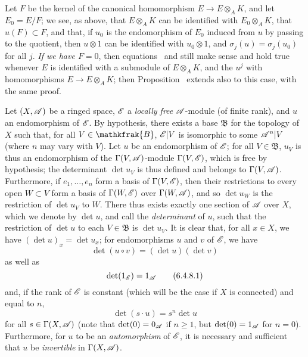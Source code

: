 \begin{remark}[6.4.7]
Let $F$ be the kernel of the canonical homomorphism $E\to E\otimes_A K$, and let $E_0=E/F$;
we see, as above, that $E\otimes_A K$ can be identified with $E_0\otimes_A K$, that $u(F)\subset F$, and that, if $u_0$ is the endomorphism of $E_0$ induced from $u$ by passing to the quotient, then $u\otimes1$ can be identified with $u_0\otimes1$, and $\sigma_j(u)=\sigma_j(u_0)$ for all $j$.
\emph{If we have $F=0$}, then equations~ and  still make sense and hold true whenever $E$ is identified with a submodule of $E\otimes_A K$, and the $u^j$ with homomorphisms $E\to E\otimes_A K$;
then Proposition~ extends also to this case, with the same proof.
\end{remark}

\begin{env}[6.4.8]
\label{II.6.4.8}
Let $(X,\mathscr{A})$ be a ringed space, $\mathscr{E}$ a \emph{locally free} $\mathscr{A}$-module (of finite rank), and $u$ an endomorphism of $\mathscr{E}$.
By hypothesis, there exists a base $\mathfrak{B}$ for the topology of $X$ such that, for all $V\in\mathkfrak{B}$, $\mathscr{E}|V$ is isomorphic to some $\mathscr{A}^n|V$ (where $n$ may vary with $V$).
Let $u$ be an endomorphism of $\mathscr{E}$;
for all $V\in\mathfrak{B}$, $u_V$ is thus an endomorphism of the $\Gamma(V,\mathscr{A})$-module $\Gamma(V,\mathscr{E})$, which is free by hypothesis;
the determinant $\det u_V$ is thus defined and belongs to $\Gamma(V,\mathscr{A})$.
Furthermore, if $e_1,\ldots,e_n$ form a basis of $\Gamma(V,\mathscr{E})$, then their restrictions to every open $W\subset V$ form a basis of $\Gamma(W,\mathscr{E})$ over $\Gamma(W,\mathscr{A})$, and so $\det u_W$ is the restriction of $\det u_V$ to $W$.
There thus exists exactly one section of $\mathscr{A}$ over $X$, which we denote by $\det u$, and call the \emph{determinant} of $u$, such that the restriction of $\det u$ to each $V\in\mathfrak{B}$ is $\det u_V$.
It is clear that, for all $x\in X$, we have $(\det u)_x=\det u_x$;
for endomorphisms $u$ and $v$ of $\mathscr{E}$, we have
\[
\label{II.6.4.8.1}
  \det(u\circ v) = (\det u)(\det v)
\tag{6.4.8.1}
\]
as well as
\[
\label{II.6.4.8.1}
  \det(1_{\mathscr{E}}) = 1_{\mathscr{A}}
\tag{6.4.8.1}
\]
and, if the rank of $\mathscr{E}$ is constant (which will be the case  if $X$ is connected) and equal to $n$,
\[
\label{II.6.4.8.3}
  \det(s\cdot u) = s^n\det u
\tag{6.4.8.3}
\]
for all $s\in\Gamma(X,\mathscr{A})$ (note that $\det(0)=0_{\mathscr{A}}$ if $n\geq1$, but $\det(0)=1_{\mathscr{A}}$ for $n=0$).
Furthermore, for $u$ to be an \emph{automorphism} of $\mathscr{E}$, it is necessary and sufficient that $u$ be \emph{invertible} in $\Gamma(X,\mathscr{A})$.


\end{env}
